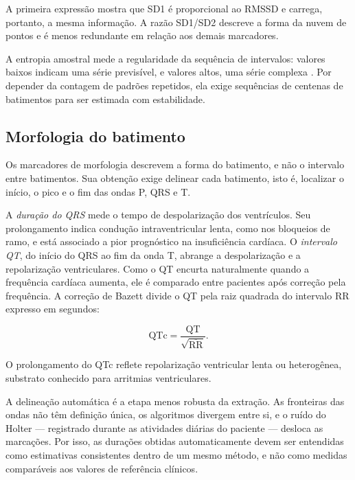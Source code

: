 \noindent
A primeira expressão mostra que SD1 é proporcional ao \gls{RMSSD} e carrega,
portanto, a mesma informação. A razão SD1/SD2 descreve a forma da nuvem de
pontos e é menos redundante em relação aos demais marcadores.

A entropia amostral mede a regularidade da sequência de intervalos: valores
baixos indicam uma série previsível, e valores altos, uma série complexa
\cite{richman2000physiological}. Por depender da contagem de padrões
repetidos, ela exige sequências de centenas de batimentos para ser
estimada com estabilidade.

\subsection{Morfologia do batimento}
\label{subsec:fund-morfologia}

Os marcadores de morfologia descrevem a forma do batimento, e não o
intervalo entre batimentos. Sua obtenção exige delinear cada batimento,
isto é, localizar o início, o pico e o fim das ondas P, QRS e T.

A \textit{duração do QRS} mede o tempo de despolarização dos ventrículos.
Seu prolongamento indica condução intraventricular lenta, como nos bloqueios
de ramo, e está associado a pior prognóstico na insuficiência cardíaca. O
\textit{intervalo QT}, do início do QRS ao fim da onda T, abrange a
despolarização e a repolarização ventriculares. Como o QT encurta
naturalmente quando a frequência cardíaca aumenta, ele é comparado entre
pacientes após correção pela frequência. A correção de Bazett
\cite{bazett1920analysis} divide o QT pela raiz quadrada do intervalo RR
expresso em segundos:

\begin{equation}
	\mathrm{QTc} = \frac{\mathrm{QT}}{\sqrt{\overline{\mathrm{RR}}}}.
	\label{eq:bazett}
\end{equation}

\noindent
O prolongamento do QTc reflete repolarização ventricular lenta ou
heterogênea, substrato conhecido para arritmias ventriculares.

A delineação automática é a etapa menos robusta da extração. As fronteiras
das ondas não têm definição única, os algoritmos divergem entre si, e o
ruído do Holter --- registrado durante as atividades diárias do paciente ---
desloca as marcações. Por isso, as durações obtidas automaticamente devem
ser entendidas como estimativas consistentes dentro de um mesmo método, e
não como medidas comparáveis aos valores de referência clínicos.

